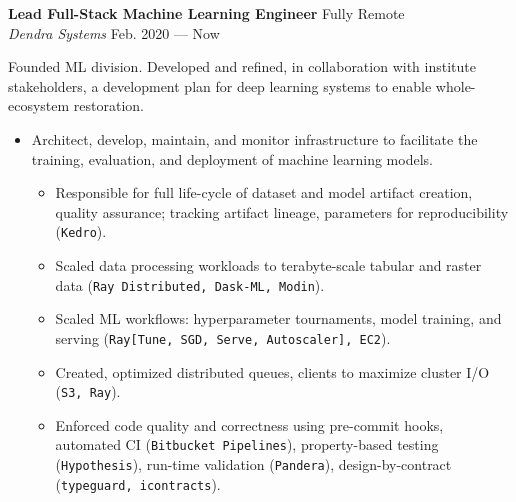 \documentclass[a4paper,12pt]{article}
\newcommand{\ressubheading}[4]{{\begin{minipage}{\textwidth}
                                    \textbf{#1} \hfill #2 \\
                                    \textit{#3} \hfill #4 \\
\end{minipage}}}
\begin{document}
    \ressubheading{Lead Full-Stack Machine Learning Engineer}{Fully Remote}{Dendra Systems}{Feb. 2020 --- Now}

    \vspace{-6pt} Founded ML division. Developed and refined, in collaboration with institute stakeholders, a development plan for deep learning systems to enable whole-ecosystem restoration.
    \begin{itemize}
        \item Architect, develop, maintain, and monitor infrastructure to facilitate the training, evaluation, and deployment of machine learning models.
        \begin{itemize}
            \item Responsible for full life-cycle of dataset and model artifact creation, quality assurance;
            tracking artifact lineage, parameters for reproducibility (\texttt{Kedro}).
            \item Scaled data processing workloads to terabyte-scale tabular and raster data (\texttt{Ray Distributed, Dask-ML, Modin}).
            \item Scaled ML workflows: hyperparameter tournaments, model training, and serving (\texttt{Ray[Tune, SGD, Serve, Autoscaler], EC2}).
            \item Created, optimized distributed queues, clients to maximize cluster I/O (\texttt{S3, Ray}).
            \item Enforced code quality and correctness using pre-commit hooks, automated CI (\texttt{Bitbucket Pipelines}), property-based testing (\texttt{Hypothesis}), run-time validation (\texttt{Pandera}), design-by-contract (\texttt{typeguard, icontracts}).
        \end{itemize}


\end{itemize}
\end{document}
